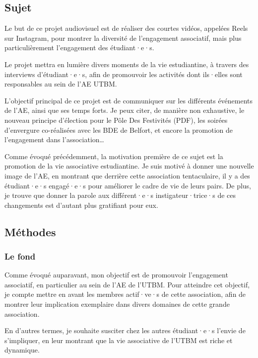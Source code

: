 
\subsection{Sujet}\label{subsec:sujet}

Le but de ce projet audiovisuel est de réaliser des courtes vidéos, appelées Reels sur Instagram, pour montrer la diversité de l'engagement associatif, mais plus particulièrement l'engagement des étudiant·e·s.

Le projet mettra en lumière divers moments de la vie estudiantine, à travers des interviews d'étudiant·e·s, afin de promouvoir les activités dont ils·elles sont responsables au sein de l'\gls{AE} \gls{UTBM}.

L'objectif principal de ce projet est de communiquer sur les différents événements de l'\gls{AE}, ainsi que ses temps forts.
Je peux citer, de manière non exhaustive, le nouveau principe d'élection pour le Pôle Des Festivités (\gls{PDF}), les soirées d'envergure co-réalisées avec les BDE de Belfort, et encore la promotion de l'engagement dans l'association\ldots

Comme évoqué précédemment, la motivation première de ce sujet est la promotion de la vie associative estudiantine.
Je suis motivé à donner une nouvelle image de l'\gls{AE}, en montrant que derrière cette association tentaculaire, il y a des étudiant·e·s engagé·e·s pour améliorer le cadre de vie de leurs pairs.
De plus, je trouve que donner la parole aux différent·e·s instigateur·trice·s de ces changements est d'autant plus gratifiant pour eux.

\subsection{Méthodes}\label{subsec:methodes}

\subsubsection{Le fond}

Comme évoqué auparavant, mon objectif est de promouvoir l'engagement associatif, en particulier au sein de l'\gls{AE} de l'\gls{UTBM}.
Pour atteindre cet objectif, je compte mettre en avant les membres actif·ve·s de cette association, afin de montrer leur implication exemplaire dans divers domaines de cette grande association.

En d'autres termes, je souhaite susciter chez les autres étudiant·e·s l'envie de s'impliquer, en leur montrant que la vie associative de l'\gls{UTBM} est riche et dynamique.

